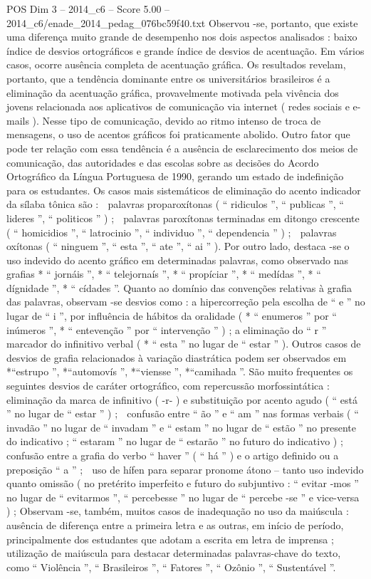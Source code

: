 \begin{textsample}{POS Dim 3 – 2014\_c6 – Score 5.00 – 2014\_c6/enade\_2014\_pedag\_076bc59f40.txt}
Observou -se, portanto, que existe uma diferença muito grande de desempenho nos dois aspectos analisados : baixo índice de desvios ortográficos e grande índice de desvios de acentuação.
Em vários casos, ocorre ausência completa de acentuação gráfica.
Os resultados revelam, portanto, que a tendência dominante entre os universitários brasileiros é a eliminação da acentuação gráfica, provavelmente motivada pela vivência dos jovens relacionada aos aplicativos de comunicação via internet ( redes sociais e e-mails ).
Nesse tipo de comunicação, devido ao ritmo intenso de troca de mensagens, o uso de acentos gráficos foi praticamente abolido.
Outro fator que pode ter relação com essa tendência é a ausência de esclarecimento dos meios de comunicação, das autoridades e das escolas sobre as decisões do Acordo Ortográfico da Língua Portuguesa de 1990, gerando um estado de indefinição para os estudantes.
Os casos mais sistemáticos de eliminação do acento indicador da sílaba tônica são :  palavras proparoxítonas ( “ ridiculos ”, “ publicas ”, “ lideres ”, “ politicos ” ) ;  palavras paroxítonas terminadas em ditongo crescente ( “ homicidios ”, “ latrocinio ”, “ individuo ”, “ dependencia ” ) ;  palavras oxítonas ( “ ninguem ”, “ esta ”, “ ate ”, “ ai ” ).
Por outro lado, destaca -se o uso indevido do acento gráfico em determinadas palavras, como observado nas grafias * “ jornáis ”, * “ telejornaís ”, * “ propíciar ”, * “ medídas ”, * “ dígnidade ”, * “ cídades ”.
Quanto ao domínio das convenções relativas à grafia das palavras, observam -se desvios como : a hipercorreção pela escolha de “ e ” no lugar de “ i ”, por influência de hábitos da oralidade ( * “ enumeros ” por “ inúmeros ”, * “ entevenção ” por “ intervenção ” ) ; a eliminação do “ r ” marcador do infinitivo verbal ( * “ esta ” no lugar de “ estar ” ).
Outros casos de desvios de grafia relacionados à variação diastrática podem ser observados em *“estrupo ”, *“automovís ”, *“viensse ”, *“camihada ”.
São muito frequentes os seguintes desvios de caráter ortográfico, com repercussão morfossintática :  eliminação da marca de infinitivo ( -r- ) e substituição por acento agudo ( “ está ” no lugar de “ estar ” ) ;  confusão entre “ ão ” e “ am ” nas formas verbais ( “ invadão ” no lugar de “ invadam ” e “ estam ” no lugar de “ estão ” no presente do indicativo ; “ estaram ” no lugar de “ estarão ” no futuro do indicativo ) ;  confusão entre a grafia do verbo “ haver ” ( “ há ” ) e o artigo definido ou a preposição “ a ” ;  uso de hífen para separar pronome átono – tanto uso indevido quanto omissão ( no pretérito imperfeito e futuro do subjuntivo : “ evitar -mos ” no lugar de “ evitarmos ”, “ percebesse ” no lugar de “ percebe -se ” e vice-versa ) ; Observam -se, também, muitos casos de inadequação no uso da maiúscula : ausência de diferença entre a primeira letra e as outras, em início de período, principalmente dos estudantes que adotam a escrita em letra de imprensa ; utilização de maiúscula para destacar determinadas palavras-chave do texto, como “ Violência ”, “ Brasileiros ”, “ Fatores ”, “ Ozônio ”, “ Sustentável ”.

\end{textsample}

